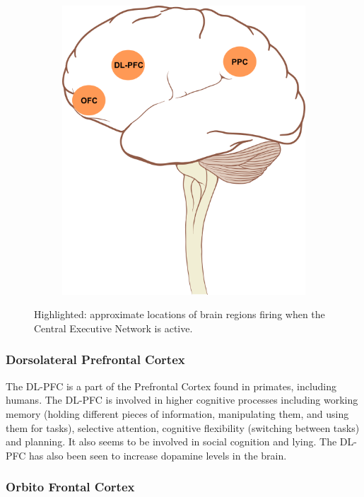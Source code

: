 \documentclass[a4paper, amsfonts, amssymb, amsmath, reprint, showkeys, nofootinbib, twoside]{revtex4-1}
\begin{document}
\begin{figure}[h!]
\begin{subfigure}[b]{0.48\linewidth}
    \includegraphics[width=\linewidth]{images/side-cen.png}
  \end{subfigure}
  \caption{Highlighted: approximate locations of brain regions firing when the Central Executive Network is active.}
  \label{fig:cen}
\end{figure}

\subsubsection{Dorsolateral Prefrontal Cortex}

The DL-PFC is a part of the Prefrontal Cortex found in primates, including
humans. The DL-PFC is involved in higher cognitive processes including working memory
(holding different pieces of information, manipulating them, and using them for
tasks), selective attention, cognitive flexibility (switching between tasks) and
planning. It also seems to be involved in social cognition and lying. The DL-PFC has
also been seen to increase dopamine levels in the brain. \cite{dlpfcmemory,dlpfctasks,dlpfclying}

\subsubsection{Orbito Frontal Cortex}
\end{document}
